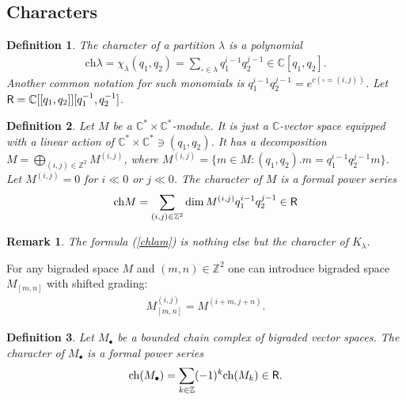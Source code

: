 \documentclass[12pt]{article}
\newtheorem{defn}{Definition}[section]
\newtheorem{rem}{Remark}[section]
\numberwithin{equation}{section}
\theoremstyle{definition}
\newcommand {\BC}   {\mathbb C}
\begin{document}
\subsection{Characters}
\begin{defn}\normalfont
The \textit{character} of a partition $\lambda$ is a polynomial
    \begin{align}\label{chlam}
    \mathrm{ch} \lambda = \chi _{\lambda} (q_1 , q_2 ) = \sum\limits_{\square \in \lambda} q_1^{i-1} q_2^{j-1} \in \mathbb{C}[q_1 , q_2].
\end{align}
Another common notation for such monomials is $q_1^{i-1}q_{2}^{j-1}=e^{c(\square = (i, j))}$.
Let ${\sf R} = {\BC}[[q_{1}, q_{2}]][q_{1}^{-1}, q_{2}^{-1}]$. 
\end{defn}
\begin{defn}\normalfont
    Let $M$ be a $\mathbb{C}^{*} \times \mathbb{C}^{*}$-module. It is just a $\mathbb{C}$-vector space equipped with a linear action of $\mathbb{C}^{*}\times\mathbb{C}^{*} \ni (q_1, q_2)$. It has a decomposition $M = \bigoplus\limits_{(i,j)\in \mathbb{Z}^{2}} M^{(i,j)}$, where $M^{(i, j)} = \{m \in M:  (q_1, q_2).m = q_{1}^{i-1}q_{2}^{j-1}m\}$. Let $M^{(i, j)}=0$ for $i \ll 0$ or $j\ll0$. The \textit{character} of $M$ is a formal power series
    \begin{align*}
    \mathrm{ch} M = \sum\limits_{(i, j) \in \mathbb{Z}^2} \dim M^{(i, j)} q_1^{i-1} q_2^{j-1} \in {\sf R} 
\end{align*}
\end{defn}
\begin{rem}\normalfont
    The formula (\ref{chlam}) is nothing else but the character of $K_{\lambda}$.
\end{rem}
For any bigraded space $M$ and $(m, n) \in \mathbb{Z}^{2}$ one can introduce bigraded space $M_{[m, n]}$ with shifted grading:
\begin{align*}
    M_{[m, n]}^{(i, j)} = M^{(i+m, j+n)}.
\end{align*}
\begin{defn}\normalfont
    Let $M_{\bullet}$ be a bounded chain complex of bigraded vector spaces. The \textit{character} of $M_{\bullet}$ is a formal power series
    \begin{align}\label{chd}
    \mathrm{ch} ({M}_{\bullet}) = \sum\limits_{k \in \mathbb{Z}} (-1)^{k} \mathrm{ch} ( {M}_{k} ) \in {\sf R} .
\end{align}
\end{defn}
\end{document}
